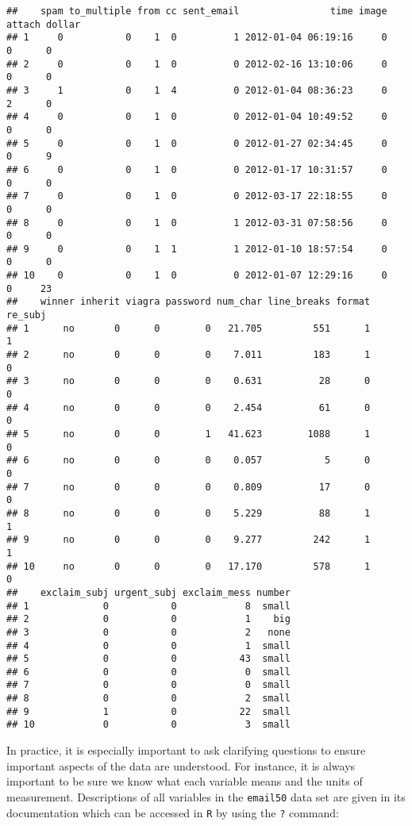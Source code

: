 \documentclass[
]{article}
\begin{document}
\begin{verbatim}
##    spam to_multiple from cc sent_email                time image attach dollar
## 1     0           0    1  0          1 2012-01-04 06:19:16     0      0      0
## 2     0           0    1  0          0 2012-02-16 13:10:06     0      0      0
## 3     1           0    1  4          0 2012-01-04 08:36:23     0      2      0
## 4     0           0    1  0          0 2012-01-04 10:49:52     0      0      0
## 5     0           0    1  0          0 2012-01-27 02:34:45     0      0      9
## 6     0           0    1  0          0 2012-01-17 10:31:57     0      0      0
## 7     0           0    1  0          0 2012-03-17 22:18:55     0      0      0
## 8     0           0    1  0          1 2012-03-31 07:58:56     0      0      0
## 9     0           0    1  1          1 2012-01-10 18:57:54     0      0      0
## 10    0           0    1  0          0 2012-01-07 12:29:16     0      0     23
##    winner inherit viagra password num_char line_breaks format re_subj
## 1      no       0      0        0   21.705         551      1       1
## 2      no       0      0        0    7.011         183      1       0
## 3      no       0      0        0    0.631          28      0       0
## 4      no       0      0        0    2.454          61      0       0
## 5      no       0      0        1   41.623        1088      1       0
## 6      no       0      0        0    0.057           5      0       0
## 7      no       0      0        0    0.809          17      0       0
## 8      no       0      0        0    5.229          88      1       1
## 9      no       0      0        0    9.277         242      1       1
## 10     no       0      0        0   17.170         578      1       0
##    exclaim_subj urgent_subj exclaim_mess number
## 1             0           0            8  small
## 2             0           0            1    big
## 3             0           0            2   none
## 4             0           0            1  small
## 5             0           0           43  small
## 6             0           0            0  small
## 7             0           0            0  small
## 8             0           0            2  small
## 9             1           0           22  small
## 10            0           0            3  small
\end{verbatim}

In practice, it is especially important to ask clarifying questions to
ensure important aspects of the data are understood. For instance, it is
always important to be sure we know what each variable means and the
units of measurement. Descriptions of all variables in the
\texttt{email50} data set are given in its documentation which can be
accessed in \texttt{R} by using the \texttt{?} command:
\end{document}
